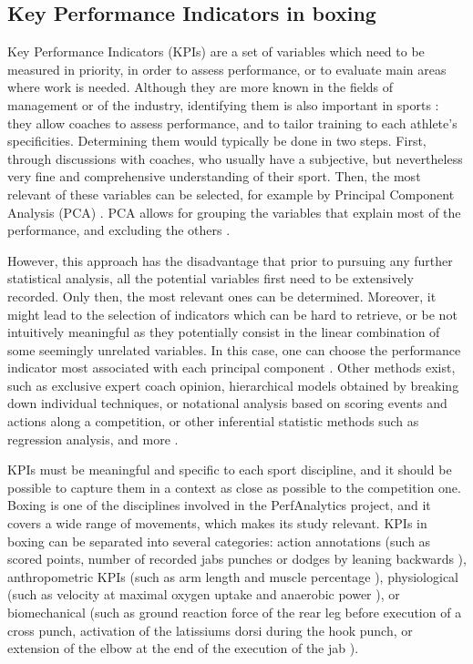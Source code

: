 \subsection{Key Performance Indicators in boxing}

Key Performance Indicators (KPIs) are a set of variables which need to be measured in priority, in order to assess performance, or to evaluate main areas where work is needed. Although they are more known in the fields of management or of the industry, identifying them is also important in sports \cite{Hughes2002,Butterworth2013}: they allow coaches to assess performance, and to tailor training to each athlete's specificities. Determining them would typically be done in two steps. First, through discussions with coaches, who usually have a subjective, but nevertheless very fine and comprehensive understanding of their sport. Then, the most relevant of these variables can be selected, for example by Principal Component Analysis (PCA) \cite{Hotelling1933}. PCA allows for grouping the variables that explain most of the performance, and excluding the others \cite{ODonoghue2008}.

However, this approach has the disadvantage that prior to pursuing any further statistical analysis, all the potential variables first need to be extensively recorded. Only then, the most relevant ones can be determined. Moreover, it might lead to the selection of indicators which can be hard to retrieve, or be not intuitively meaningful as they potentially consist in the linear combination of some seemingly unrelated variables. In this case, one can choose the performance indicator most associated with each principal component \cite{ODonoghue2008}. Other methods exist, such as exclusive expert coach opinion, hierarchical models obtained by breaking down individual techniques, or notational analysis based on scoring events and actions along a competition, or other inferential statistic methods such as regression analysis, and more \cite{Hughes2002,Butterworth2013}.

KPIs must be meaningful and specific to each sport discipline, and it should be possible to capture them in a context as close as possible to the competition one. Boxing is one of the disciplines involved in the PerfAnalytics project, and it covers a wide range of movements, which makes its study relevant. KPIs in boxing can be separated into several categories: action annotations (such as scored points, number of recorded jabs punches or dodges by leaning backwards \cite{Thomson2013}), anthropometric KPIs (such as arm length and muscle percentage \cite{Chaabene2015}), physiological (such as velocity at maximal oxygen uptake and anaerobic power \cite{Chaabene2015}), or biomechanical (such as ground reaction force of the rear leg before execution of a cross punch, activation of the latissiums dorsi during the hook punch, or extension of the elbow at the end of the execution of the jab \cite{Lenetsky2020}). 

